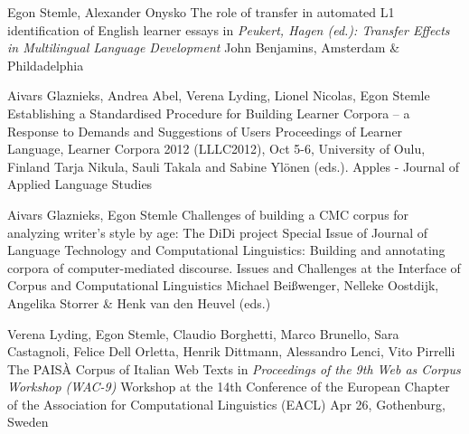 \documentclass[11pt,a4paper]{moderncv}
\begin{document}
    

        {Egon Stemle, Alexander Onysko}
        {\small The role of transfer in automated L1 identification of English learner essays}
        {\small in \emph{Peukert, Hagen (ed.): Transfer Effects in Multilingual Language Development}}
        {\small John Benjamins, Amsterdam \& Phildadelphia}
        {}
    
        {Aivars Glaznieks, Andrea Abel, Verena Lyding, Lionel Nicolas, Egon
        Stemle}
        {\small Establishing a Standardised Procedure for Building Learner
        Corpora – a Response to Demands and Suggestions of Users}
        {\small Proceedings of Learner Language, Learner Corpora 2012
        (LLLC2012), Oct 5-6, University of Oulu, Finland}
        {\small Tarja Nikula, Sauli Takala and Sabine Ylönen (eds.). Apples -
        Journal of Applied Language Studies}
        {}

        {Aivars Glaznieks, Egon Stemle}
        {\small Challenges of building a CMC corpus for analyzing writer's
        style by age: The DiDi project} 
        {\small Special Issue of Journal of Language Technology and
        Computational Linguistics: Building and annotating corpora of
        computer-mediated discourse. Issues and Challenges at the Interface of
        Corpus and Computational Linguistics}
        {\small Michael Beißwenger, Nelleke Oostdijk, Angelika Storrer \& Henk van den Heuvel (eds.)}
        {}

        {Verena Lyding, Egon Stemle, Claudio Borghetti, Marco Brunello, Sara
        Castagnoli, Felice Dell Orletta, Henrik Dittmann, Alessandro Lenci, Vito
        Pirrelli}
        {The PAIS\`{A} Corpus of Italian Web Texts}
        {\small in {\em Proceedings of the 9th Web as Corpus Workshop (WAC-9)}}
        {\small Workshop at the 14th Conference of the European Chapter of the
        Association for Computational Linguistics (EACL)}
        {\small Apr 26, Gothenburg, Sweden}
        {}
\end{document}
